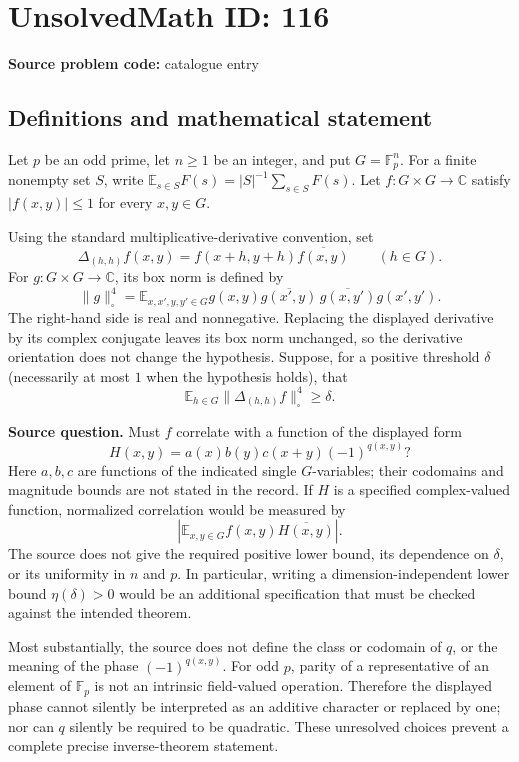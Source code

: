 \documentclass[11pt]{article}
\newcommand{\C}{\mathbb{C}}
\newcommand{\F}{\mathbb{F}}
\newcommand{\E}{\mathbb{E}}
\begin{document}
\section*{UnsolvedMath ID: 116}
\textbf{Source problem code:} catalogue entry
\subsection{Definitions and mathematical statement}
Let $p$ be an odd prime, let $n\geq1$ be an integer, and put $G=\F_p^n$. For a finite nonempty set $S$, write $\E_{s\in S}F(s)=|S|^{-1}\sum_{s\in S}F(s)$. Let $f:G\times G\to\C$ satisfy $|f(x,y)|\leq1$ for every $x,y\in G$.

Using the standard multiplicative-derivative convention, set
\[
 \Delta_{(h,h)}f(x,y)=f(x+h,y+h)\overline{f(x,y)}\qquad(h\in G).
\]
For $g:G\times G\to\C$, its box norm is defined by
\[
 \|g\|_{\square}^4=
 \E_{x,x',y,y'\in G}
 g(x,y)\overline{g(x',y)}\,\overline{g(x,y')}g(x',y').
\]
The right-hand side is real and nonnegative. Replacing the displayed derivative by its complex conjugate leaves its box norm unchanged, so the derivative orientation does not change the hypothesis. Suppose, for a positive threshold $\delta$ (necessarily at most $1$ when the hypothesis holds), that
\[
 \E_{h\in G}\|\Delta_{(h,h)}f\|_{\square}^4\geq\delta.
\]

\textbf{Source question.} Must $f$ correlate with a function of the displayed form
\[
 H(x,y)=a(x)b(y)c(x+y)(-1)^{q(x,y)}?
\]
Here $a,b,c$ are functions of the indicated single $G$-variables; their codomains and magnitude bounds are not stated in the record. If $H$ is a specified complex-valued function, normalized correlation would be measured by
\[
 \left|\E_{x,y\in G}f(x,y)\overline{H(x,y)}\right|.
\]
The source does not give the required positive lower bound, its dependence on $\delta$, or its uniformity in $n$ and $p$. In particular, writing a dimension-independent lower bound $\eta(\delta)>0$ would be an additional specification that must be checked against the intended theorem.

Most substantially, the source does not define the class or codomain of $q$, or the meaning of the phase $(-1)^{q(x,y)}$. For odd $p$, parity of a representative of an element of $\F_p$ is not an intrinsic field-valued operation. Therefore the displayed phase cannot silently be interpreted as an additive character or replaced by one; nor can $q$ silently be required to be quadratic. These unresolved choices prevent a complete precise inverse-theorem statement.
\end{document}
